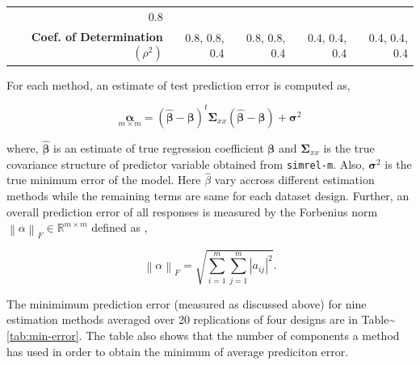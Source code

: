 \documentclass[12pt,A4paper,authoryear]{elsarticle} %
\theoremstyle{definition}
\theoremstyle{definition}
\theoremstyle{remark}
\begin{document}
\begin{longtable}[]{@{}rrrrr@{}}
\begin{minipage}[t]{0.13\columnwidth}
0.8\strut
\end{minipage}\tabularnewline
\begin{minipage}[t]{0.36\columnwidth}\raggedleft\strut
\textbf{Coef. of Determination \((\rho^2)\)}\strut
\end{minipage} & \begin{minipage}[t]{0.13\columnwidth}\raggedleft\strut
0.8, 0.8, 0.4\strut
\end{minipage} & \begin{minipage}[t]{0.13\columnwidth}\raggedleft\strut
0.8, 0.8, 0.4\strut
\end{minipage} & \begin{minipage}[t]{0.13\columnwidth}\raggedleft\strut
0.4, 0.4, 0.4\strut
\end{minipage} & \begin{minipage}[t]{0.13\columnwidth}\raggedleft\strut
0.4, 0.4, 0.4\strut
\end{minipage}\tabularnewline
\bottomrule
\end{longtable}

For each method, an estimate of test prediction error is computed as,

\[\underset{m \times m}{\boldsymbol{\alpha}} = 
\left(
\hat{\boldsymbol{\beta}} - \boldsymbol{\beta}
\right) ^t \boldsymbol{\Sigma}_{xx}
\left(
\hat{\boldsymbol{\beta}} - \boldsymbol{\beta}
\right) + \boldsymbol{\sigma}^2\]

where, \(\hat{\boldsymbol{\beta}}\) is an estimate of true regression
coefficient \(\boldsymbol{\beta}\) and \(\boldsymbol{\Sigma}_{xx}\) is
the true covariance structure of predictor variable obtained from
\texttt{simrel-m}. Also, \(\boldsymbol{\sigma}^2\) is the true minimum
error of the model. Here \(\hat{\beta}\) vary accross different
estimation methods while the remaining terms are same for each dataset
design. Further, an overall prediction error of all responses is
measured by the Forbenius norm
\(\left\lVert\alpha\right\rVert_F \in \mathbb{R}^{m \times m}\) defined
as \citep{golub2012matrix},

\[\left\lVert\alpha\right\rVert_F = \sqrt{\sum_{i = 1}^m \sum_{j = 1}^m {\left|a_{ij}\right|^2}}.\]

The minimimum prediction error (measured as discussed above) for nine
estimation methods averaged over 20 replications of four designs are in
Table\textasciitilde{}\ref{tab:min-error}. The table also shows that the
number of components a method has used in order to obtain the minimum of
average prediciton error.
\end{document}
